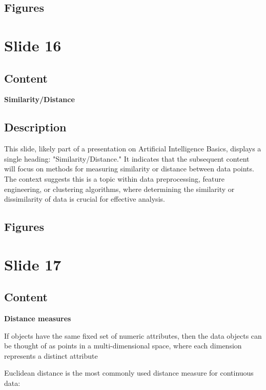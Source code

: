 \documentclass{article}%
\begin{document}
\subsection{Figures}%
\begin{figure}[H]%
\centering%
\end{figure}

%
\newpage%
\section{Slide 16}%
\label{sec:Slide16}%
\subsection{Content}%

\textbf{Similarity/Distance}
%
\subsection{Description}%
This slide, likely part of a presentation on Artificial Intelligence Basics, displays a single heading: "Similarity/Distance."  It indicates that the subsequent content will focus on methods for measuring similarity or distance between data points.  The context suggests this is a topic within data preprocessing, feature engineering, or clustering algorithms, where determining the similarity or dissimilarity of data is crucial for effective analysis.%
\subsection{Figures}%
\begin{figure}[H]%
\centering%
\end{figure}

%
\newpage%
\section{Slide 17}%
\label{sec:Slide17}%
\subsection{Content}%

\textbf{Distance measures}

If objects have the same fixed set of numeric attributes, then the
data objects can be thought of as points in a multi-dimensional
space, where each dimension represents a distinct attribute

Euclidean distance is the most commonly used
distance measure for continuous data:
\end{document}
